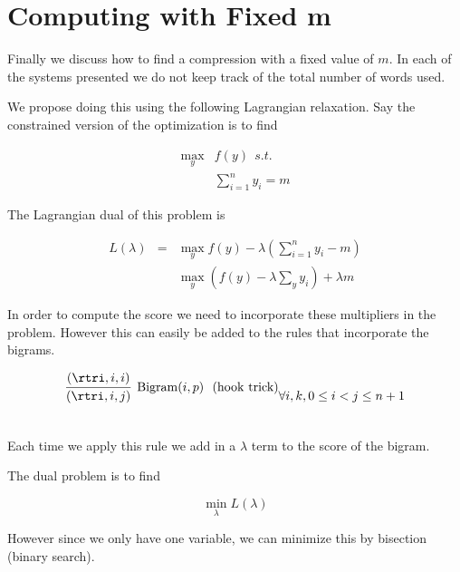 \documentclass{article}
\begin{document}

\pagebreak

\section{Computing with Fixed m}


Finally we discuss how to find a compression with a fixed value of $m$. In each of the systems presented we do not keep track of the total number of words used.

We propose doing this using the following Lagrangian relaxation. Say the constrained version of the optimization is to find

\begin{eqnarray*}
  \max_y & f(y) \ \  s.t.  \\
  & \displaystyle \sum_{i=1}^n y_{i} = m
\end{eqnarray*}


The Lagrangian dual of this problem is

\begin{eqnarray*}
L(\lambda)  &=& \max_y f(y)  - \lambda (\sum_{i=1}^n y_i - m) \\
&& \max_y (f(y) - \lambda \sum_y y_i) + \lambda m
\end{eqnarray*}


In order to compute the score we need to incorporate these multipliers in the problem. However this can easily be added to the rules that incorporate the bigrams.

\begin{eqnarray*}
\infer[\mathrm{Bigram}(i,p) \ \ \mathrm{(hook\ trick)}]{(\rtri, i,j)}{(\rtri, i, i)} &  \forall i,k,  0 \leq i < j \leq n + 1\\\\
\end{eqnarray*}

Each time we apply this rule we add in a $\lambda$ term to the score of the bigram.

The dual problem is to find

\[ \min_{\lambda} L(\lambda) \]

However since we only have one variable, we can minimize this by bisection (binary search).




\end{document}
